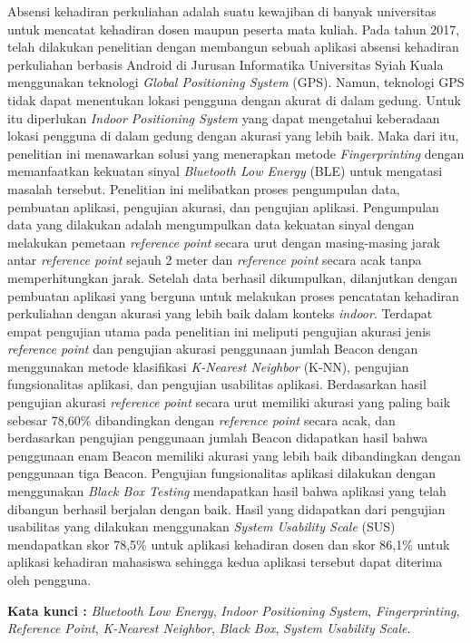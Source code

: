 \begin{abstractind}
Absensi kehadiran perkuliahan adalah suatu kewajiban di banyak universitas untuk mencatat kehadiran dosen maupun peserta mata kuliah. Pada tahun 2017, telah dilakukan penelitian dengan membangun sebuah aplikasi absensi kehadiran perkuliahan berbasis Android di Jurusan Informatika Universitas Syiah Kuala menggunakan teknologi \textit{Global Positioning System} (GPS). Namun, teknologi GPS tidak dapat menentukan lokasi pengguna dengan akurat di dalam gedung. Untuk itu diperlukan \textit{Indoor Positioning System} yang dapat mengetahui keberadaan lokasi pengguna di dalam gedung dengan akurasi yang lebih baik. Maka dari itu, penelitian ini menawarkan solusi yang menerapkan metode \textit{Fingerprinting} dengan memanfaatkan kekuatan sinyal \textit{Bluetooth Low Energy} (BLE) untuk mengatasi masalah tersebut. Penelitian ini melibatkan proses pengumpulan data, pembuatan aplikasi, pengujian akurasi, dan pengujian aplikasi. Pengumpulan data yang dilakukan adalah mengumpulkan data kekuatan sinyal dengan melakukan pemetaan \textit{reference point} secara urut dengan masing-masing jarak antar \textit{reference point} sejauh 2 meter dan \textit{reference point} secara acak tanpa memperhitungkan jarak. Setelah data berhasil dikumpulkan, dilanjutkan dengan pembuatan aplikasi yang berguna untuk melakukan proses pencatatan kehadiran perkuliahan dengan akurasi yang lebih baik dalam konteks \textit{indoor}. Terdapat empat pengujian utama pada penelitian ini meliputi pengujian akurasi jenis \textit{reference point} dan pengujian akurasi penggunaan jumlah Beacon dengan menggunakan metode klasiﬁkasi \textit{K-Nearest Neighbor} (K-NN), pengujian fungsionalitas aplikasi, dan pengujian usabilitas aplikasi. Berdasarkan hasil pengujian akurasi \textit{reference point} secara urut memiliki akurasi yang paling baik sebesar 78,60\% dibandingkan dengan \textit{reference point} secara acak, dan berdasarkan pengujian penggunaan jumlah Beacon didapatkan hasil bahwa penggunaan enam Beacon memiliki akurasi yang lebih baik dibandingkan dengan penggunaan tiga Beacon. Pengujian fungsionalitas aplikasi dilakukan dengan menggunakan \textit{Black Box Testing} mendapatkan hasil bahwa aplikasi yang telah dibangun berhasil berjalan dengan baik. Hasil yang didapatkan dari pengujian usabilitas yang dilakukan menggunakan \textit{System Usability Scale} (SUS) mendapatkan skor 78,5\% untuk aplikasi kehadiran dosen dan skor 86,1\% untuk aplikasi kehadiran mahasiswa sehingga kedua aplikasi tersebut dapat diterima oleh pengguna.


\bigskip
\noindent
\textbf{Kata kunci :} \textit{Bluetooth Low Energy}, \textit{Indoor Positioning System}, \textit{Fingerprinting}, \textit{Reference Point}, \textit{K-Nearest Neighbor}, \textit{Black Box}, \textit{System Usability Scale}.
\end{abstractind}